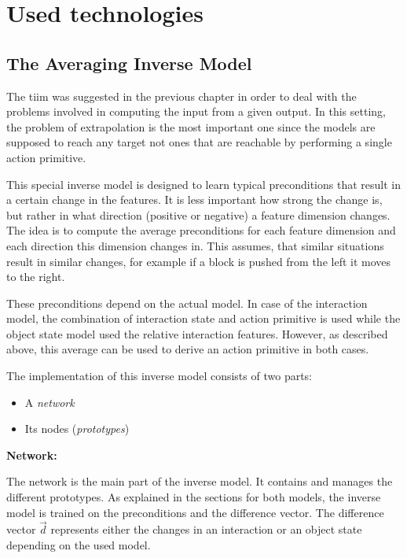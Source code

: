 \section{Used technologies \label{sec:technologies}}

\subsection{The Averaging Inverse Model \label{sec:invModelRealization}} 

The \acrfull{tiim} was suggested in the previous chapter in order to deal with the problems involved in computing the input from a given output. In this setting, the problem of extrapolation is the most important one since the models are supposed to reach any target not ones that are reachable by performing a single action primitive.

This special inverse model is designed to learn typical preconditions that result in a certain change in the features. It is less important how strong the change is, but rather in what direction (positive or negative) a feature dimension changes. The idea is to compute the average preconditions for each feature dimension and each direction this dimension changes in. This assumes, that similar situations result in similar changes, for example if a block is pushed from the left it moves to the right.
 
These preconditions depend on the actual model. In case of the interaction model, the combination of interaction state and action primitive is used while the object state model used the relative interaction features. However, as described above, this average can be used to derive an action primitive in both cases.

The implementation of this inverse model consists of two parts: 
\begin{itemize}
\item A \textit{network}
\item Its nodes (\textit{prototypes})
\end{itemize}

\textbf{Network:}

The network is the main part of the inverse model. It contains and manages the different prototypes. 
As explained in the sections for both models, the inverse model is trained on the preconditions and the difference vector. The difference vector $\vec{d}$ represents either the changes in an interaction or an object state depending on the used model.

